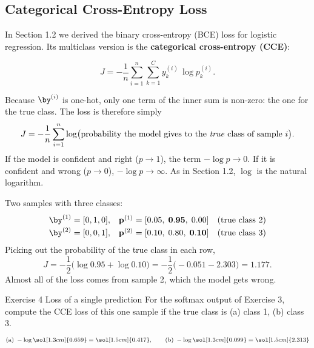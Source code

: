 \documentclass[12pt, a4paper]{article}
\providecommand{\bp}{\mathbf{p}}
\begin{document}
\subsection{Categorical Cross-Entropy Loss}

In Section 1.2 we derived the binary cross-entropy (BCE) loss for logistic
regression. Its multiclass version is the
\textbf{categorical cross-entropy (CCE)}:
\begin{resultbox}
  \[
    J = -\frac{1}{n} \sum_{i=1}^{n} \sum_{k=1}^{C}
    y^{(i)}_k \,\log p^{(i)}_k .
  \]
\end{resultbox}
Because $\by^{(i)}$ is one-hot, only one term of the inner sum is non-zero:
the one for the true class. The loss is therefore simply
\[
  J = -\frac{1}{n} \sum_{i=1}^{n} \log\bigl(
  \text{probability the model gives to the \emph{true} class of sample } i
  \bigr).
\]
If the model is confident and right ($p \to 1$), the term $-\log p \to 0$.
If it is confident and wrong ($p \to 0$), $-\log p \to \infty$. As in
Section 1.2, $\log$ is the natural logarithm.

\begin{example}
  Two samples with three classes:
  \[
    \begin{array}{lll}
      \by^{(1)} = [0, 1, 0], & \bp^{(1)} = [0.05,\; \mathbf{0.95},\; 0.00]
                             & \text{(true class 2)}                       \\[2pt]
      \by^{(2)} = [0, 0, 1], & \bp^{(2)} = [0.10,\; 0.80,\; \mathbf{0.10}]
                             & \text{(true class 3)}
    \end{array}
  \]
  Picking out the probability of the true class in each row,
  \[
    J = -\frac{1}{2}\bigl(\log 0.95 + \log 0.10\bigr)
    = -\frac{1}{2}\bigl(-0.051 - 2.303\bigr) = 1.177 .
  \]
  Almost all of the loss comes from sample 2, which the model gets wrong.
\end{example}

\begin{stepbox}{Exercise 4 \quad Loss of a single prediction}
  For the softmax output of Exercise 3, compute the CCE loss of this one
  sample if the true class is (a) class 1, (b) class 3.
  \[
    \text{(a)}\; -\log \sol[1.3cm]{0.659} = \sol[1.5cm]{0.417},
    \qquad
    \text{(b)}\; -\log \sol[1.3cm]{0.099} = \sol[1.5cm]{2.313}
  \]
\end{stepbox}

\end{document}
